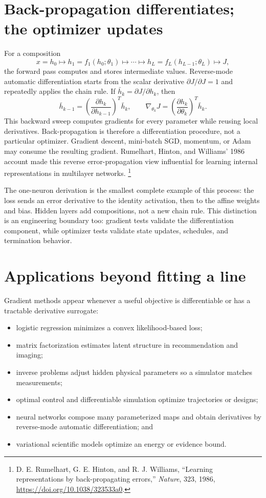 \section{Back-propagation differentiates; the optimizer updates}

For a composition
\[
x=h_0\longmapsto h_1=f_1(h_0;\theta_1)
\longmapsto\cdots\longmapsto
h_L=f_L(h_{L-1};\theta_L)\longmapsto J,
\]
the forward pass computes and stores intermediate values. Reverse-mode
automatic differentiation starts from the scalar derivative
$\partial J/\partial J=1$ and repeatedly applies the chain rule. If
$\bar h_k=\partial J/\partial h_k$, then
\[
\bar h_{k-1}
=\left(\frac{\partial h_k}{\partial h_{k-1}}\right)^T\bar h_k,
\qquad
\nabla_{\theta_k}J
=\left(\frac{\partial h_k}{\partial\theta_k}\right)^T\bar h_k.
\]
This backward sweep computes gradients for every parameter while reusing local
derivatives. Back-propagation is therefore a differentiation procedure, not a
particular optimizer. Gradient descent, mini-batch SGD, momentum, or Adam may
consume the resulting gradient. Rumelhart, Hinton, and Williams' 1986 account
made this reverse error-propagation view influential for learning internal
representations in multilayer networks.
\footnote{D. E. Rumelhart, G. E. Hinton, and R. J. Williams, ``Learning
representations by back-propagating errors,'' \emph{Nature}, 323, 1986,
\url{https://doi.org/10.1038/323533a0}.}

The one-neuron derivation is the smallest complete example of this process:
the loss sends an error derivative to the identity activation, then to the
affine weights and bias. Hidden layers add compositions, not a new chain rule.
This distinction is an engineering boundary too: gradient tests validate the
differentiation component, while optimizer tests validate state updates,
schedules, and termination behavior.

\section{Applications beyond fitting a line}

Gradient methods appear whenever a useful objective is differentiable or has a
tractable derivative surrogate:

\begin{itemize}
  \item logistic regression minimizes a convex likelihood-based loss;
  \item matrix factorization estimates latent structure in recommendation and
  imaging;
  \item inverse problems adjust hidden physical parameters so a simulator
  matches measurements;
  \item optimal control and differentiable simulation optimize trajectories or
  designs;
  \item neural networks compose many parameterized maps and obtain derivatives
  by reverse-mode automatic differentiation; and
  \item variational scientific models optimize an energy or evidence bound.
\end{itemize}

